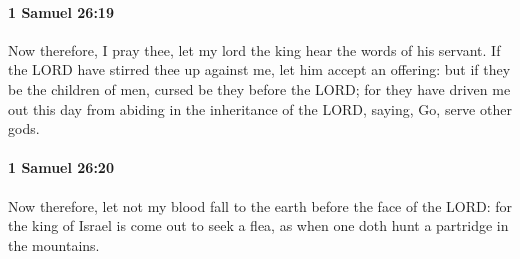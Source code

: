		\paragraph{1 Samuel 26:19} %
			\label{1SAMUEL-26-19}

			Now therefore, I pray thee, let my lord the king hear the words of his servant. If the LORD have stirred thee up against me, let him accept an offering: but if they be the children of men, cursed be they before the LORD; for they have driven me out this day from abiding in the inheritance of the LORD, saying, Go, serve other gods.


		\paragraph{1 Samuel 26:20} %
			\label{1SAMUEL-26-20}

			Now therefore, let not my blood fall to the earth before the face of the LORD: for the king of Israel is come out to seek a flea, as when one doth hunt a partridge in the mountains.

